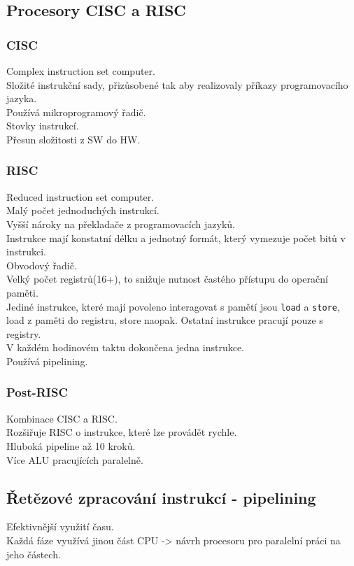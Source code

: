 \subsection{Procesory CISC a RISC}
\subsubsection*{CISC}
Complex instruction set computer. \\
Složité instrukční sady, přizůsobené tak aby realizovaly příkazy programovacího jazyka. \\
Používá mikroprogramový řadič. \\
Stovky instrukcí. \\
Přesun složitosti z SW do HW. \\

\subsubsection*{RISC}
Reduced instruction set computer. \\
Malý počet jednoduchých instrukcí. \\
Vyšší nároky na překladače z programovacích jazyků. \\
Instrukce mají konstatní délku a jednotný formát, který vymezuje počet bitů v instrukci. \\
Obvodový řadič. \\
Velký počet registrů(16+), to snižuje nutnost častého přístupu do operační paměti. \\
Jediné instrukce, které mají povoleno interagovat s pamětí jsou \texttt{load} a \texttt{store}, load z paměti do registru, store naopak. Ostatní instrukce pracují pouze s registry.\\
V každém hodinovém taktu dokončena jedna instrukce. \\
Používá pipelining. \\

\subsubsection*{Post-RISC}
Kombinace CISC a RISC. \\
Rozšiřuje RISC o instrukce, které lze provádět rychle. \\
Hluboká pipeline až 10 kroků. \\
Více ALU pracujících paralelně. \\

\subsection{Řetězové zpracování instrukcí - pipelining}
Efektivnější využití času. \\
Každá fáze využívá jinou část CPU -> návrh procesoru pro paralelní práci na jeho částech. \\

